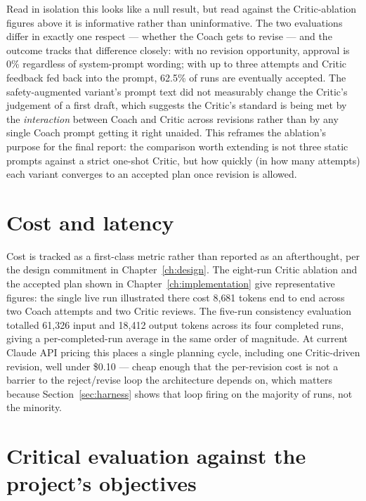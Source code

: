 Read in isolation this looks like a null result, but read against the Critic-ablation figures above it is informative rather than uninformative. The two evaluations differ in exactly one respect --- whether the Coach gets to revise --- and the outcome tracks that difference closely: with no revision opportunity, approval is 0\% regardless of system-prompt wording; with up to three attempts and Critic feedback fed back into the prompt, 62.5\% of runs are eventually accepted. The safety-augmented variant's prompt text did not measurably change the Critic's judgement of a first draft, which suggests the Critic's standard is being met by the \emph{interaction} between Coach and Critic across revisions rather than by any single Coach prompt getting it right unaided. This reframes the ablation's purpose for the final report: the comparison worth extending is not three static prompts against a strict one-shot Critic, but how quickly (in how many attempts) each variant converges to an accepted plan once revision is allowed.

\section{Cost and latency}

Cost is tracked as a first-class metric rather than reported as an afterthought, per the design commitment in Chapter~\ref{ch:design}. The eight-run Critic ablation and the accepted plan shown in Chapter~\ref{ch:implementation} give representative figures: the single live run illustrated there cost 8{,}681 tokens end to end across two Coach attempts and two Critic reviews. The five-run consistency evaluation totalled 61{,}326 input and 18{,}412 output tokens across its four completed runs, giving a per-completed-run average in the same order of magnitude. At current Claude API pricing this places a single planning cycle, including one Critic-driven revision, well under \$0.10 --- cheap enough that the per-revision cost is not a barrier to the reject/revise loop the architecture depends on, which matters because Section~\ref{sec:harness} shows that loop firing on the majority of runs, not the minority.

\section{Critical evaluation against the project's objectives}

